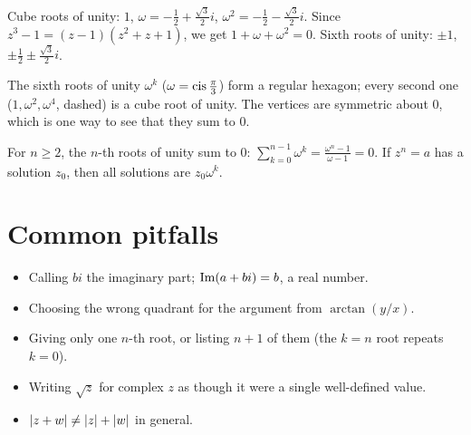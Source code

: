 \begin{example}
Cube roots of unity: $1$, $\omega = -\frac12 + \frac{\sqrt3}2 i$, $\omega^2 = -\frac12 -
\frac{\sqrt3}2 i$. Since $z^3 - 1 = (z-1)(z^2 + z + 1)$, we get $1 + \omega + \omega^2 = 0$.
Sixth roots of unity: $\pm1$, $\pm\frac12\pm\frac{\sqrt3}2 i$.
\end{example}

\begin{center}
\end{center}
The sixth roots of unity $\omega^k$ ($\omega = \operatorname{cis}\frac\pi3$) form a regular hexagon; every
second one ($1, \omega^2, \omega^4$, dashed) is a cube root of unity. The vertices are
symmetric about $0$, which is one way to see that they sum to $0$.

\begin{proposition}
For $n \ge 2$, the $n$-th roots of unity sum to $0$: $\sum_{k=0}^{n-1}\omega^k =
\frac{\omega^n - 1}{\omega - 1} = 0$. If $z^n = a$ has a solution $z_0$, then all solutions are
$z_0\omega^k$.
\end{proposition}

\section{Common pitfalls}
\begin{itemize}
  \item Calling $bi$ the imaginary part; $\operatorname{Im}(a + bi) = b$, a real number.
  \item Choosing the wrong quadrant for the argument from $\arctan(y/x)$.
  \item Giving only one $n$-th root, or listing $n+1$ of them (the $k = n$ root repeats $k=0$).
  \item Writing $\sqrt{z}$ for complex $z$ as though it were a single well-defined value.
  \item $\left\lvert z + w \right\rvert \ne \left\lvert z \right\rvert + \left\lvert w \right\rvert$ in general.
\end{itemize}

